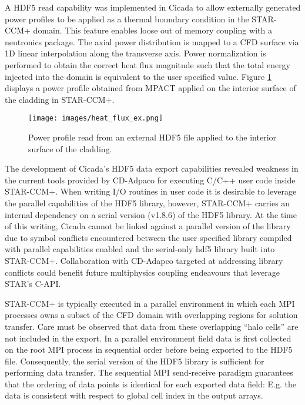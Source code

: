 A HDF5 read capability was implemented in Cicada to allow externally generated power profiles to be applied as a thermal boundary condition in the STAR-CCM+ domain.  This feature enables loose out of memory coupling with a neutronics package. 
The axial power distribution is mapped to a CFD surface via 1D linear interpolation along the transverse axis.  Power normalization is performed to obtain the correct heat flux magnitude such that the total energy injected into the domain is equivalent to the user specified value.   Figure \ref{fig:heat_flux_ex} displays a power profile obtained from MPACT applied on the interior surface of the cladding in STAR-CCM+.

\begin{figure}[hbtp]
\centering
\texttt{[image: images/heat\_flux\_ex.png]}
\caption{Power profile read from an external HDF5 file applied to the interior surface of the cladding.}
\label{fig:heat_flux_ex}
\end{figure}

The development of Cicada's HDF5 data export capabilities revealed weakness in the current tools provided by CD-Adpaco for executing C/C++ user code inside STAR-CCM+.  When writing I/O routines in user code it is desirable to leverage the parallel capabilities of the HDF5 library, however, STAR-CCM+ carries an internal dependency on a serial version (v1.8.6) of the HDF5 library.  At the time of this writing, Cicada cannot be linked against a parallel version of the library due to symbol conflicts encountered between the user specified library compiled with parallel capabilities enabled and the serial-only hdf5 library built into STAR-CCM+.
Collaboration with CD-Adapco targeted at addressing library conflicts could benefit future multiphysics coupling endeavours that leverage STAR's C-API.

STAR-CCM+ is typically executed in a parallel environment in which each MPI processes owns a subset of the CFD domain with overlapping regions for solution transfer.  Care must be observed that data from these overlapping ``halo cells'' are not included in the export.  In a parallel environment field data is first collected on the root MPI process in sequential order before being exported to the HDF5 file.  Consequently, the serial version of the HDF5 library is sufficient for performing data transfer.  The sequential MPI send-receive paradigm guarantees that the ordering of data points is identical for each exported data field: E.g. the data is consistent with respect to global cell index in the output arrays.   

